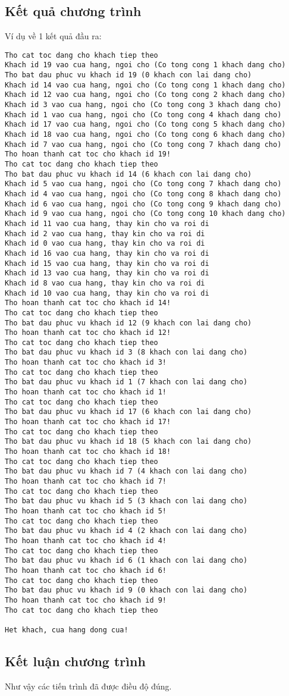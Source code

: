 \subsection{Kết quả chương trình}
Ví dụ về 1 kết quả đầu ra:
\begin{lstlisting}
Tho cat toc dang cho khach tiep theo
Khach id 19 vao cua hang, ngoi cho (Co tong cong 1 khach dang cho)
Tho bat dau phuc vu khach id 19 (0 khach con lai dang cho)
Khach id 14 vao cua hang, ngoi cho (Co tong cong 1 khach dang cho)
Khach id 12 vao cua hang, ngoi cho (Co tong cong 2 khach dang cho)
Khach id 3 vao cua hang, ngoi cho (Co tong cong 3 khach dang cho)
Khach id 1 vao cua hang, ngoi cho (Co tong cong 4 khach dang cho)
Khach id 17 vao cua hang, ngoi cho (Co tong cong 5 khach dang cho)
Khach id 18 vao cua hang, ngoi cho (Co tong cong 6 khach dang cho)
Khach id 7 vao cua hang, ngoi cho (Co tong cong 7 khach dang cho)
Tho hoan thanh cat toc cho khach id 19!
Tho cat toc dang cho khach tiep theo
Tho bat dau phuc vu khach id 14 (6 khach con lai dang cho)
Khach id 5 vao cua hang, ngoi cho (Co tong cong 7 khach dang cho)
Khach id 4 vao cua hang, ngoi cho (Co tong cong 8 khach dang cho)
Khach id 6 vao cua hang, ngoi cho (Co tong cong 9 khach dang cho)
Khach id 9 vao cua hang, ngoi cho (Co tong cong 10 khach dang cho)
Khach id 11 vao cua hang, thay kin cho va roi di
Khach id 2 vao cua hang, thay kin cho va roi di
Khach id 0 vao cua hang, thay kin cho va roi di
Khach id 16 vao cua hang, thay kin cho va roi di
Khach id 15 vao cua hang, thay kin cho va roi di
Khach id 13 vao cua hang, thay kin cho va roi di
Khach id 8 vao cua hang, thay kin cho va roi di
Khach id 10 vao cua hang, thay kin cho va roi di
Tho hoan thanh cat toc cho khach id 14!
Tho cat toc dang cho khach tiep theo
Tho bat dau phuc vu khach id 12 (9 khach con lai dang cho)
Tho hoan thanh cat toc cho khach id 12!
Tho cat toc dang cho khach tiep theo
Tho bat dau phuc vu khach id 3 (8 khach con lai dang cho)
Tho hoan thanh cat toc cho khach id 3!
Tho cat toc dang cho khach tiep theo
Tho bat dau phuc vu khach id 1 (7 khach con lai dang cho)
Tho hoan thanh cat toc cho khach id 1!
Tho cat toc dang cho khach tiep theo
Tho bat dau phuc vu khach id 17 (6 khach con lai dang cho)
Tho hoan thanh cat toc cho khach id 17!
Tho cat toc dang cho khach tiep theo
Tho bat dau phuc vu khach id 18 (5 khach con lai dang cho)
Tho hoan thanh cat toc cho khach id 18!
Tho cat toc dang cho khach tiep theo
Tho bat dau phuc vu khach id 7 (4 khach con lai dang cho)
Tho hoan thanh cat toc cho khach id 7!
Tho cat toc dang cho khach tiep theo
Tho bat dau phuc vu khach id 5 (3 khach con lai dang cho)
Tho hoan thanh cat toc cho khach id 5!
Tho cat toc dang cho khach tiep theo
Tho bat dau phuc vu khach id 4 (2 khach con lai dang cho)
Tho hoan thanh cat toc cho khach id 4!
Tho cat toc dang cho khach tiep theo
Tho bat dau phuc vu khach id 6 (1 khach con lai dang cho)
Tho hoan thanh cat toc cho khach id 6!
Tho cat toc dang cho khach tiep theo
Tho bat dau phuc vu khach id 9 (0 khach con lai dang cho)
Tho hoan thanh cat toc cho khach id 9!
Tho cat toc dang cho khach tiep theo

Het khach, cua hang dong cua!
\end{lstlisting}

\subsection{Kết luận chương trình}
Như vậy các tiến trình đã được điều độ đúng.